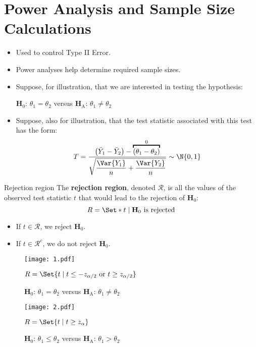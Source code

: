 \section{Power Analysis and Sample Size Calculations}
\begin{itemize}
    \item Used to control Type II Error.
    \item Power analyses help determine required sample sizes.
    \item Suppose, for illustration, that we are interested in testing the hypothesis:
          \begin{tightcenter}
              $ \mathbf{H}_0 $: $ \theta_1=\theta_2 $ versus $ \mathbf{H}_\text{A} $: $ \theta_1\ne \theta_2 $
          \end{tightcenter}
    \item Suppose, also for illustration, that the test statistic associated with this test has
          the form:
          \[ T=\frac{\bigl(\bar{Y}_1-\bar{Y}_2\bigr)-\overbracket{(\theta_1-\theta_2)}^0}{\displaystyle \sqrt{\frac{\Var{Y_1}}{n}+\frac{\Var{Y_2}}{n} }}\sim \N{0,1}  \]
\end{itemize}
\begin{Definition}{Rejection region}{}
    The \textbf{rejection region}, denoted $ \mathcal{R} $, is
    all the values of the observed test statistic $ t $ that would lead to the rejection
    of $ \mathbf{H}_0 $:
    \[ \mathcal{R}=\Set*{t\mid \mathbf{H}_0\text{ is rejected}} \]
\end{Definition}
\begin{itemize}
    \item If $ t\in\mathcal{R} $, we reject $ \mathbf{H}_0 $.
    \item If $ t\in\mathcal{R}^c $, we do not reject $ \mathbf{H}_0 $.
\end{itemize}
\begin{figure}[!htbp]
    \centering
    \texttt{[image: 1.pdf]}
    \caption{$ \mathbf{H}_0 $: $ \theta_1=\theta_2 $ versus $ \mathbf{H}_\text{A} $: $ \theta_1\ne \theta_2 $}{$ \mathcal{R}=\Set{t\mid t\le -z_{\alpha/2}\text{ or }t\ge z_{\alpha/2}} $}
\end{figure}
\begin{figure}[!htbp]
    \centering
    \texttt{[image: 2.pdf]}
    \caption{$ \mathbf{H}_0 $: $ \theta_1\le\theta_2 $ versus $ \mathbf{H}_\text{A} $: $ \theta_1>\theta_2 $}{$ \mathcal{R}=\Set{t\mid t\ge z_{\alpha}} $}
\end{figure}
